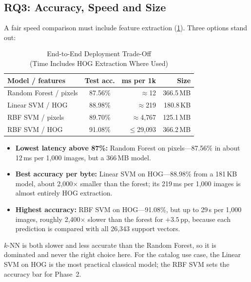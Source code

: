 \documentclass[conference]{IEEEtran}
\newcommand{\pp}{\,pp}                       %
\begin{document}
\subsection{RQ3: Accuracy, Speed and Size}
A fair speed comparison must include feature extraction (\cref{tab:tradeoff}). Three options stand out:

\begin{table}[t]
  \centering
  \caption{End-to-End Deployment Trade-Off\\(Time Includes HOG Extraction Where Used)}
  \label{tab:tradeoff}
  \setlength{\tabcolsep}{4pt}
  \begin{tabular}{@{}l c r r@{}}
    \toprule
    Model / features & Test acc. & ms per 1k & Size \\
    \midrule
    Random Forest / pixels & 87.56\% & $\approx$12 & 366.5\,MB \\
    Linear SVM / HOG       & 88.98\% & $\approx$219 & 180.8\,KB \\
    RBF SVM / pixels       & 89.70\% & $\approx$4{,}767 & 125.1\,MB \\
    RBF SVM / HOG          & 91.08\% & $\le$29{,}093 & 366.2\,MB \\
    \bottomrule
  \end{tabular}
\end{table}

\begin{itemize}
  \item \textbf{Lowest latency above 87\%:} Random Forest on pixels---87.56\% in about 12\,ms per 1{,}000 images, but a
        366\,MB model.
  \item \textbf{Best accuracy per byte:} Linear SVM on HOG---88.98\% from a 181\,KB model, about 2{,}000$\times$ smaller
        than the forest; its 219\,ms per 1{,}000 images is almost entirely HOG extraction.
  \item \textbf{Highest accuracy:} RBF SVM on HOG---91.08\%, but up to 29\,s per 1{,}000 images, roughly 2{,}400$\times$
        slower than the forest for $+3.5$\pp, because each prediction is compared with all 26{,}343 support vectors.
\end{itemize}
$k$-NN is both slower and less accurate than the Random Forest, so it is dominated and never the right choice here. For
the catalog use case, the Linear SVM on HOG is the most practical classical model; the RBF SVM sets the accuracy bar
for Phase~2.
\end{document}
